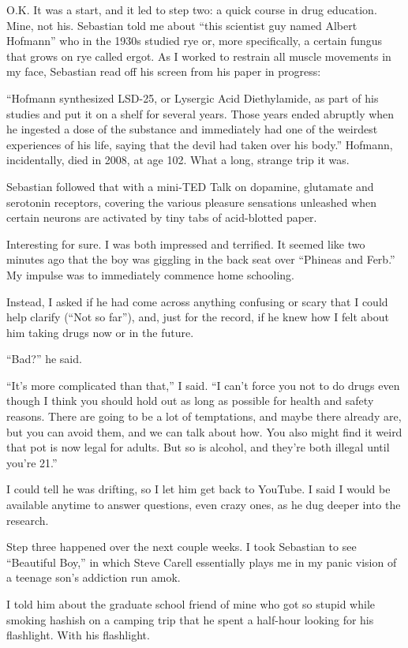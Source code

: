 O.K. It was a start, and it led to step two: a quick course in drug
education. Mine, not his. Sebastian told me about ``this scientist guy
named Albert Hofmann'' who in the 1930s studied rye or, more
specifically, a certain fungus that grows on rye called ergot. As I
worked to restrain all muscle movements in my face, Sebastian read off
his screen from his paper in progress:

``Hofmann synthesized LSD-25, or Lysergic Acid Diethylamide, as part of
his studies and put it on a shelf for several years. Those years ended
abruptly when he ingested a dose of the substance and immediately had
one of the weirdest experiences of his life, saying that the devil had
taken over his body.'' Hofmann, incidentally, died in 2008, at age 102.
What a long, strange trip it was.

Sebastian followed that with a mini-TED Talk on dopamine, glutamate and
serotonin receptors, covering the various pleasure sensations unleashed
when certain neurons are activated by tiny tabs of acid-blotted paper.

Interesting for sure. I was both impressed and terrified. It seemed like
two minutes ago that the boy was giggling in the back seat over
``Phineas and Ferb.'' My impulse was to immediately commence home
schooling.

Instead, I asked if he had come across anything confusing or scary that
I could help clarify (``Not so far''), and, just for the record, if he
knew how I felt about him taking drugs now or in the future.

``Bad?'' he said.

``It's more complicated than that,'' I said. ``I can't force you not to
do drugs even though I think you should hold out as long as possible for
health and safety reasons. There are going to be a lot of temptations,
and maybe there already are, but you can avoid them, and we can talk
about how. You also might find it weird that pot is now legal for
adults. But so is alcohol, and they're both illegal until you're 21.''

I could tell he was drifting, so I let him get back to YouTube. I said I
would be available anytime to answer questions, even crazy ones, as he
dug deeper into the research.

Step three happened over the next couple weeks. I took Sebastian to see
``Beautiful Boy,'' in which Steve Carell essentially plays me in my
panic vision of a teenage son's addiction run amok.

I told him about the graduate school friend of mine who got so stupid
while smoking hashish on a camping trip that he spent a half-hour
looking for his flashlight. With his flashlight.

